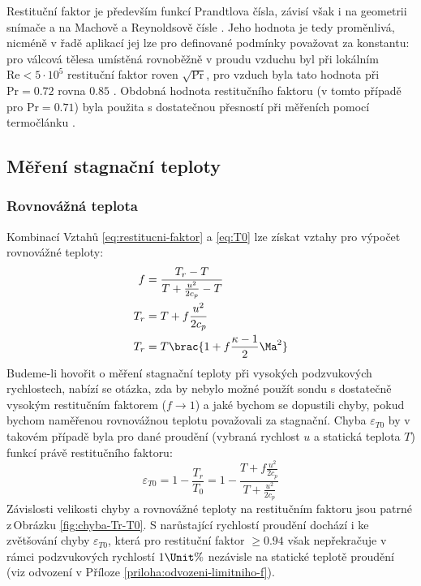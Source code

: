    Restituční faktor je především funkcí Prandtlova čísla, závisí však i na geometrii snímače a na Machově a Reynoldsově čísle \cite{Leontiev2017a}. Jeho hodnota je tedy proměnlivá, nicméně v řadě aplikací jej lze pro definované podmínky považovat za konstantu: pro válcová tělesa umístěná rovnoběžně v proudu vzduchu byl při lokálním $\textrm{Re} < 5 \cdot 10^5$ restituční faktor roven $\sqrt{\textrm{Pr}}$, pro vzduch byla tato hodnota při $\textrm{Pr} = 0.72$ rovna $0.85$ \cite{Shapiro1954}. Obdobná hodnota restitučního faktoru (v tomto případě pro $\textrm{Pr}=0.71$) byla použita s dostatečnou přesností při měřeních pomocí termočlánku \cite{Ishibashi2012}.

    \subsection{Měření stagnační teploty}
        \subsubsection{Rovnovážná teplota}
            Kombinací Vztahů \ref{eq:restitucni-faktor} a \ref{eq:T0} lze získat vztahy pro výpočet rovnovážné teploty:
            \begin{align}
                f &= \frac{T_r - T}{T + \frac{u^2}{2 c_p} - T} \\
                T_r &= T + f \frac{u^2}{2 c_p} \label{eq:rovnovazna-teplota}\\
                T_r &= T \brac{1 + f \frac{\kappa - 1}{2} \Ma ^2}
            \end{align}
            \noindent Budeme-li hovořit o měření stagnační teploty při vysokých podzvukových rychlostech, nabízí se otázka, zda by nebylo možné použít sondu s dostatečně vysokým restitučním faktorem ($f \rightarrow 1$) a jaké bychom se dopustili chyby, pokud bychom naměřenou rovnovážnou teplotu považovali za stagnační. Chyba $\varepsilon _{T0}$ by v takovém případě byla pro dané proudění (vybraná rychlost $u$ a statická teplota $T$) funkcí právě restitučního faktoru:
            \begin{equation}
                \varepsilon _{T0} = 1 - \frac{T_r}{T_0} = 1 - \frac{T + f \frac{u^2}{2 c_p}}{T + \frac{u^2}{2 c_p}}
            \end{equation}
            \noindent Závislosti velikosti chyby a rovnovážné teploty na restitučním faktoru jsou patrné z\,Obrázku \ref{fig:chyba-Tr-T0}. S narůstající rychlostí proudění dochází i ke zvětšování chyby $\varepsilon _{T0}$, která pro restituční faktor $\geq 0.94$ však nepřekračuje v rámci podzvukových rychlostí $1 \Unit{\%}$ nezávisle na statické teplotě proudění (viz odvození v Příloze \ref{priloha:odvozeni-limitniho-f}). 


